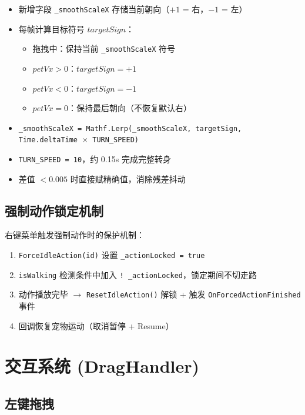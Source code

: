 \documentclass[12pt,a4paper]{ctexart}
\begin{document}
\begin{itemize}
    \item 新增字段 \texttt{\_smoothScaleX} 存储当前朝向（$+1$ = 右，$-1$ = 左）
    \item 每帧计算目标符号 $targetSign$：
    \begin{itemize}
        \item 拖拽中：保持当前 \texttt{\_smoothScaleX} 符号
        \item $petVx > 0$：$targetSign = +1$
        \item $petVx < 0$：$targetSign = -1$
        \item $petVx = 0$：保持最后朝向（不恢复默认右）
    \end{itemize}
    \item \texttt{\_smoothScaleX = Mathf.Lerp(\_smoothScaleX, targetSign, Time.deltaTime $\times$ TURN\_SPEED)}
    \item \texttt{TURN\_SPEED = 10}，约 0.15s 完成完整转身
    \item 差值 $< 0.005$ 时直接赋精确值，消除残差抖动
\end{itemize}

\subsection{强制动作锁定机制}

右键菜单触发强制动作时的保护机制：

\begin{enumerate}
    \item \texttt{ForceIdleAction(id)} 设置 \texttt{\_actionLocked = true}
    \item \texttt{isWalking} 检测条件中加入 \texttt{!\ \_actionLocked}，锁定期间不切走路
    \item 动作播放完毕 $\to$ \texttt{ResetIdleAction()} 解锁 + 触发 \texttt{OnForcedActionFinished} 事件
    \item 回调恢复宠物运动（取消暂停 + Resume）
\end{enumerate}

\section{交互系统 (DragHandler)}

\subsection{左键拖拽}
\end{document}
